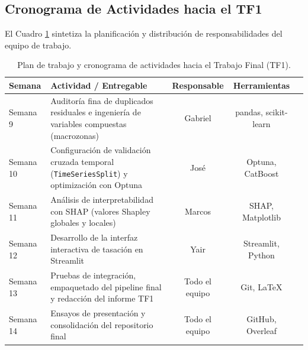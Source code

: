 \documentclass[11pt,a4paper]{article}
\begin{document}
\subsection{Cronograma de Actividades hacia el TF1}
El Cuadro \ref{tab:cronograma} sintetiza la planificación y distribución de responsabilidades del equipo de trabajo.

\begin{table}[H]
\centering
\small
\caption{Plan de trabajo y cronograma de actividades hacia el Trabajo Final (TF1).}
\label{tab:cronograma}
\begin{tabularx}{\textwidth}{lp{6.5cm}ccX}
\toprule
\textbf{Semana} & \textbf{Actividad / Entregable} & \textbf{Responsable} & \textbf{Herramientas} \\
\midrule
Semana 9 & Auditoría fina de duplicados residuales e ingeniería de variables compuestas (macrozonas) & Gabriel & pandas, scikit-learn \\
Semana 10 & Configuración de validación cruzada temporal (\texttt{TimeSeriesSplit}) y optimización con Optuna & José & Optuna, CatBoost \\
Semana 11 & Análisis de interpretabilidad con SHAP (valores Shapley globales y locales) & Marcos & SHAP, Matplotlib \\
Semana 12 & Desarrollo de la interfaz interactiva de tasación en Streamlit & Yair & Streamlit, Python \\
Semana 13 & Pruebas de integración, empaquetado del pipeline final y redacción del informe TF1 & Todo el equipo & Git, LaTeX \\
Semana 14 & Ensayos de presentación y consolidación del repositorio final & Todo el equipo & GitHub, Overleaf \\
\bottomrule
\end{tabularx}
\end{table}

\end{document}

